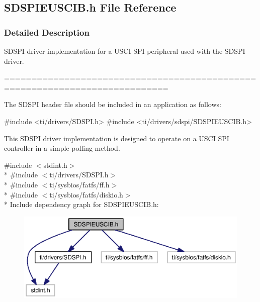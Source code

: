 \subsection{S\+D\+S\+P\+I\+E\+U\+S\+C\+I\+B.\+h File Reference}
\label{_s_d_s_p_i_e_u_s_c_i_b_8h}


\subsubsection{Detailed Description}
S\+D\+S\+P\+I driver implementation for a U\+S\+C\+I S\+P\+I peripheral used with the S\+D\+S\+P\+I driver. 

============================================================================

The S\+D\+S\+P\+I header file should be included in an application as follows\+: 
\begin{DoxyCode}
\textcolor{preprocessor}{#include <ti/drivers/SDSPI.h>}
\textcolor{preprocessor}{#include <ti/drivers/sdspi/SDSPIEUSCIB.h>}
\end{DoxyCode}


This S\+D\+S\+P\+I driver implementation is designed to operate on a U\+S\+C\+I S\+P\+I controller in a simple polling method. 

{\ttfamily \#include $<$stdint.\+h$>$}\\*
{\ttfamily \#include $<$ti/drivers/\+S\+D\+S\+P\+I.\+h$>$}\\*
{\ttfamily \#include $<$ti/sysbios/fatfs/ff.\+h$>$}\\*
{\ttfamily \#include $<$ti/sysbios/fatfs/diskio.\+h$>$}\\*
Include dependency graph for S\+D\+S\+P\+I\+E\+U\+S\+C\+I\+B.\+h\+:
\nopagebreak
\begin{figure}[H]
\begin{center}
\leavevmode
\includegraphics[width=350pt]{_s_d_s_p_i_e_u_s_c_i_b_8h__incl}
\end{center}
\end{figure}
